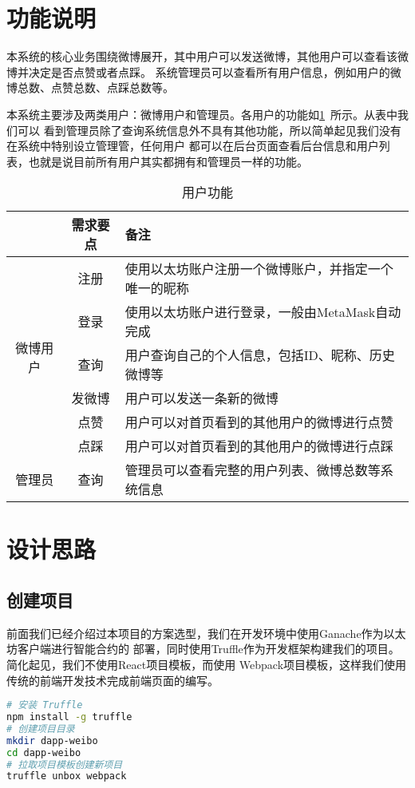 \documentclass[bwprint]{hfutreport}
\begin{document}
\section{功能说明}
本系统的核心业务围绕微博展开，其中用户可以发送微博，其他用户可以查看该微博并决定是否点赞或者点踩。
系统管理员可以查看所有用户信息，例如用户的微博总数、点赞总数、点踩总数等。

本系统主要涉及两类用户：微博用户和管理员。各用户的功能如\cref{tab:func}~所示。从表中我们可以
看到管理员除了查询系统信息外不具有其他功能，所以简单起见我们没有在系统中特别设立管理管，任何用户
都可以在后台页面查看后台信息和用户列表，也就是说目前所有用户其实都拥有和管理员一样的功能。
\begin{table}[!htbp]
    \caption{用户功能}\label{tab:func}
    \centering
    \begin{tabular}{ccl}
        \hline
        \textbf{}                 & \textbf{需求要点} & \textbf{备注}                                        \\ \hline
        \multirow{6}{*}{微博用户} & 注册              & 使用以太坊账户注册一个微博账户，并指定一个唯一的昵称 \\
                                  & 登录              & 使用以太坊账户进行登录，一般由MetaMask自动完成       \\
                                  & 查询              & 用户查询自己的个人信息，包括ID、昵称、历史微博等     \\
                                  & 发微博              & 用户可以发送一条新的微博     \\
                                  & 点赞              & 用户可以对首页看到的其他用户的微博进行点赞           \\
                                  & 点踩              & 用户可以对首页看到的其他用户的微博进行点踩           \\ \hline
        管理员                    & 查询              & 管理员可以查看完整的用户列表、微博总数等系统信息     \\ \hline
    \end{tabular}
\end{table}

\section{设计思路}

\subsection{创建项目}
前面我们已经介绍过本项目的方案选型，我们在开发环境中使用Ganache作为以太坊客户端进行智能合约的
部署，同时使用Truffle作为开发框架构建我们的项目。简化起见，我们不使用React项目模板，而使用
Webpack项目模板，这样我们使用传统的前端开发技术完成前端页面的编写。
\begin{lstlisting}[language=bash]
# 安装 Truffle
npm install -g truffle
# 创建项目目录
mkdir dapp-weibo
cd dapp-weibo
# 拉取项目模板创建新项目
truffle unbox webpack
\end{lstlisting}
\end{document}
